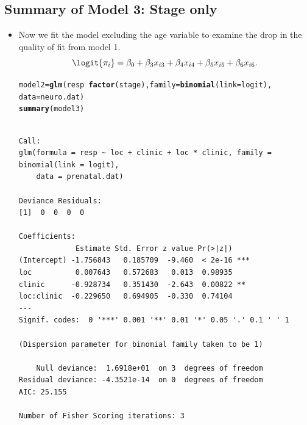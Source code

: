 \documentclass{article}\usepackage[]{graphicx}\usepackage[svgnames]{xcolor}
\makeatletter
\newcommand{\hlopt}[1]{\textcolor[rgb]{0,0,0}{#1}}%
\newcommand{\hlstd}[1]{\textcolor[rgb]{0.345,0.345,0.345}{#1}}%
\newcommand{\hlkwb}[1]{\textcolor[rgb]{0.69,0.353,0.396}{#1}}%
\newcommand{\hlkwc}[1]{\textcolor[rgb]{0.333,0.667,0.333}{#1}}%
\newcommand{\hlkwd}[1]{\textcolor[rgb]{0.737,0.353,0.396}{\textbf{#1}}}%
\newenvironment{kframe}{%
 \def\at@end@of@kframe{}%
 \ifinner\ifhmode%
  \def\at@end@of@kframe{\end{minipage}}%
  \begin{minipage}{\columnwidth}%
 \fi\fi%
 \def\FrameCommand##1{\hskip\@totalleftmargin \hskip-\fboxsep
 \colorbox{shadecolor}{##1}\hskip-\fboxsep
     \hskip-\linewidth \hskip-\@totalleftmargin \hskip\columnwidth}%
 \MakeFramed {\advance\hsize-\width
   \@totalleftmargin\z@ \linewidth\hsize
   \@setminipage}}%
 {\par\unskip\endMakeFramed%
 \at@end@of@kframe}
\newenvironment{knitrout}{}{} %
\makeatother
\begin{document}
\subsection*{Summary of Model 3: Stage only}
\begin{itemize}
    \item Now we fit the model excluding the age variable to examine the drop in the
          quality of fit from model 1.
          \[ \logit{\pi_i}=\beta_0+\beta_3x_{i3}+\beta_4x_{i4}+\beta_5x_{i5}+\beta_6x_{i6}. \]
\begin{knitrout}
\color{fgcolor}\begin{kframe}
\begin{alltt}
\hlstd{model2} \hlkwb{=} \hlkwd{glm}\hlstd{(resp} \hlopt{~} \hlkwd{factor}\hlstd{(stage),} \hlkwc{family} \hlstd{=} \hlkwd{binomial}\hlstd{(}\hlkwc{link} \hlstd{= logit),}
  \hlkwc{data} \hlstd{= neuro.dat)}
\hlkwd{summary}\hlstd{(model3)}
\end{alltt}
\begin{verbatim}

Call:
glm(formula = resp ~ loc + clinic + loc * clinic, family = binomial(link = logit), 
    data = prenatal.dat)

Deviance Residuals: 
[1]  0  0  0  0

Coefficients:
             Estimate Std. Error z value Pr(>|z|)    
(Intercept) -1.756843   0.185709  -9.460  < 2e-16 ***
loc          0.007643   0.572683   0.013  0.98935    
clinic      -0.928734   0.351430  -2.643  0.00822 ** 
loc:clinic  -0.229650   0.694905  -0.330  0.74104    
---
Signif. codes:  0 '***' 0.001 '**' 0.01 '*' 0.05 '.' 0.1 ' ' 1

(Dispersion parameter for binomial family taken to be 1)

    Null deviance:  1.6918e+01  on 3  degrees of freedom
Residual deviance: -4.3521e-14  on 0  degrees of freedom
AIC: 25.155

Number of Fisher Scoring iterations: 3
\end{verbatim}
\end{kframe}
\end{knitrout}
\end{itemize}
\end{document}
